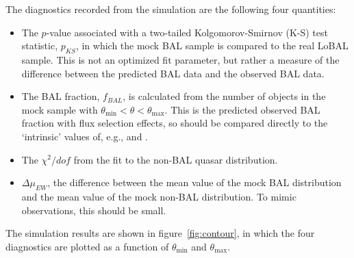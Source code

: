 The diagnostics recorded from the simulation are the following four
quantities:
\begin{itemize}
	\item The $p$-value associated with a two-tailed Kolgomorov-Smirnov (K-S) 
	test statistic, $p_{KS}$, in which the mock BAL sample is compared
	to the real LoBAL sample. This is not an optimized fit parameter, but rather a measure of
	the difference between the predicted BAL data and the observed BAL data. 
	\item The BAL fraction, $f_{BAL}$, is calculated from the 
	number of objects in the mock sample with $\theta_{\mathrm{min}}<\theta<\theta_{\mathrm{max}}$.
	This is the predicted observed BAL fraction with flux selection effects, so should be compared
	directly to the `intrinsic' values of, e.g., \cite{knigge2008} and \cite{allen2011}.
	\item The $\chi^2/dof$ from the fit to the non-BAL quasar distribution.
	\item $\Delta \mu_{EW}$, the difference between the mean value of the mock BAL
	distribution and the mean value of the mock non-BAL distribution. To mimic observations,
	this should be small.
\end{itemize}
The simulation results are shown in figure~\ref{fig:contour}, in which the 
four diagnostics are plotted as a function of $\theta_{\mathrm{min}}$ 
and $\theta_{\mathrm{max}}$. 

